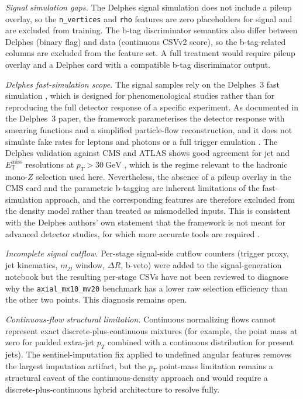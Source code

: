 \documentclass[11pt,a4paper,twocolumn]{article}
\newcommand{\GeV}{\text{GeV}}
\newcommand{\MET}{\ensuremath{E_{\mathrm{T}}^{\mathrm{miss}}}}
\begin{document}
\textit{Signal simulation gaps.}
The Delphes signal simulation does not include a pileup overlay, so the
\texttt{n\_vertices} and \texttt{rho} features are zero placeholders for
signal and are excluded from training. The b-tag discriminator semantics
also differ between Delphes (binary flag) and data (continuous CSVv2 score),
so the b-tag-related columns are excluded from the feature set. A full
treatment would require pileup overlay and a Delphes card with a compatible
b-tag discriminator output.

\textit{Delphes fast-simulation scope.}
The signal samples rely on the Delphes~3 fast simulation
\cite{delphes3}, which is designed for phenomenological studies rather than
for reproducing the full detector response of a specific experiment. As
documented in the Delphes~3 paper, the framework parameterises the detector
response with smearing functions and a simplified particle-flow
reconstruction, and it does not simulate fake rates for leptons and photons
or a full trigger emulation \cite{delphes3}. The Delphes validation against
CMS and ATLAS shows good agreement for jet and \MET{} resolutions at
$p_T > 30~\GeV$ \cite{delphes3}, which is the regime relevant to the
hadronic mono-$Z$ selection used here. Nevertheless, the absence of a
pileup overlay in the CMS card and the parametric b-tagging are inherent
limitations of the fast-simulation approach, and the corresponding features
are therefore excluded from the density model rather than treated as
mismodelled inputs. This is consistent with the Delphes authors' own
statement that the framework is not meant for advanced detector studies,
for which more accurate tools are required \cite{delphes3}.

\textit{Incomplete signal cutflow.}
Per-stage signal-side cutflow counters (trigger proxy, jet kinematics,
$m_{jj}$ window, $\Delta R$, b-veto) were added to the signal-generation
notebook but the resulting per-stage CSVs have not been reviewed to diagnose
why the \texttt{axial\_mx10\_mv20} benchmark has a lower raw selection
efficiency than the other two points. This diagnosis remains open.

\textit{Continuous-flow structural limitation.}
Continuous normalizing flows cannot represent exact discrete-plus-continuous
mixtures (for example, the point mass at zero for padded extra-jet $p_T$
combined with a continuous distribution for present jets). The
sentinel-imputation fix applied to undefined angular features removes the
largest imputation artifact, but the $p_T$ point-mass limitation remains a
structural caveat of the continuous-density approach and would require a
discrete-plus-continuous hybrid architecture to resolve fully.
\end{document}
